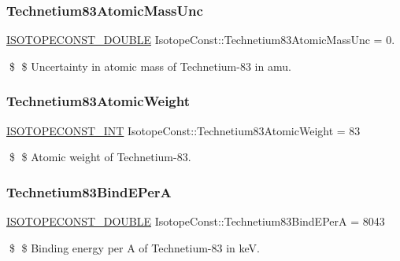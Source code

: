 \subsubsection{\texorpdfstring{Technetium83\+Atomic\+Mass\+Unc}{Technetium83AtomicMassUnc}}
{\footnotesize\ttfamily \mbox{\hyperlink{group___isotope_const-_macros_ga8f45a7272ce02c0b4c65c44636ed719a}{I\+S\+O\+T\+O\+P\+E\+C\+O\+N\+S\+T\+\_\+\+D\+O\+U\+B\+LE}} Isotope\+Const\+::\+Technetium83\+Atomic\+Mass\+Unc = 0.}

\$ \$ Uncertainty in atomic mass of Technetium-\/83 in amu. \mbox{\label{group___isotope_const-_technetium-_tc83_ga6216b6f16b7616d528f23399c7039480}} 
\subsubsection{\texorpdfstring{Technetium83\+Atomic\+Weight}{Technetium83AtomicWeight}}
{\footnotesize\ttfamily \mbox{\hyperlink{group___isotope_const-_macros_ga5f18360b3e99483a35c32d789e62621c}{I\+S\+O\+T\+O\+P\+E\+C\+O\+N\+S\+T\+\_\+\+I\+NT}} Isotope\+Const\+::\+Technetium83\+Atomic\+Weight = 83}

\$ \$ Atomic weight of Technetium-\/83. \mbox{\label{group___isotope_const-_technetium-_tc83_ga4c3d17d844d0e60c4333149a7f9c5ade}} 
\subsubsection{\texorpdfstring{Technetium83\+Bind\+E\+PerA}{Technetium83BindEPerA}}
{\footnotesize\ttfamily \mbox{\hyperlink{group___isotope_const-_macros_ga8f45a7272ce02c0b4c65c44636ed719a}{I\+S\+O\+T\+O\+P\+E\+C\+O\+N\+S\+T\+\_\+\+D\+O\+U\+B\+LE}} Isotope\+Const\+::\+Technetium83\+Bind\+E\+PerA = 8043}

\$ \$ Binding energy per A of Technetium-\/83 in keV. \mbox{\label{group___isotope_const-_technetium-_tc83_ga443c5360c2cc3da4edb4897f8da5ca26}} 

